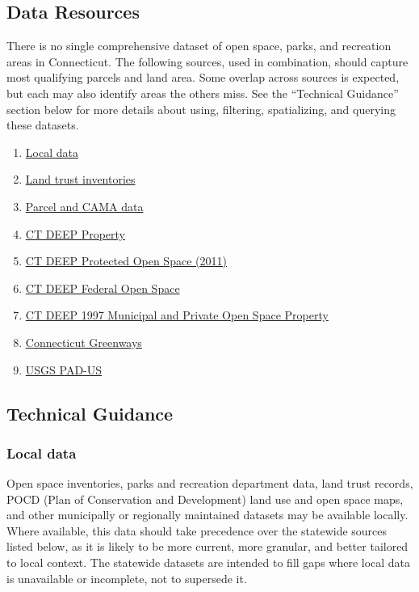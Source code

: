 \documentclass[
  letterpaper,
  DIV=11,
  numbers=noendperiod]{scrreprt}
\providecommand{\tightlist}{%
  \setlength{\itemsep}{0pt}\setlength{\parskip}{0pt}}
\begin{document}
\subsection{Data Resources}\label{data-resources-1}

There is no single comprehensive dataset of open space, parks, and
recreation areas in Connecticut. The following sources, used in
combination, should capture most qualifying parcels and land area. Some
overlap across sources is expected, but each may also identify areas the
others miss. See the ``Technical Guidance'' section below for more
details about using, filtering, spatializing, and querying these
datasets.

\begin{enumerate}
\def\labelenumi{\arabic{enumi}.}
\tightlist
\item
  \hyperref[sec-local-data2]{Local data}
\item
  \hyperref[sec-land-trust-inventories]{Land trust inventories}
\item
  \hyperref[sec-parcel-and-cama-data2]{Parcel and CAMA data}
\item
  \hyperref[sec-ct-deep-property]{CT DEEP Property}
\item
  \hyperref[sec-ct-deep-protected-open-space-2011]{CT DEEP Protected
  Open Space (2011)}
\item
  \hyperref[sec-ct-deep-federal-open-space]{CT DEEP Federal Open Space}
\item
  \hyperref[sec-ct-deep-1997-municipal-and-private-open-space-property]{CT
  DEEP 1997 Municipal and Private Open Space Property}
\item
  \hyperref[sec-greenways]{Connecticut Greenways}
\item
  \hyperref[sec-usgs-protected-areas-database-of-the-united-states]{USGS
  PAD-US}
\end{enumerate}

\subsection{Technical Guidance}\label{technical-guidance-1}

\subsubsection{Local data}\label{sec-local-data2}

Open space inventories, parks and recreation department data, land trust
records, POCD (Plan of Conservation and Development) land use and open
space maps, and other municipally or regionally maintained datasets may
be available locally. Where available, this data should take precedence
over the statewide sources listed below, as it is likely to be more
current, more granular, and better tailored to local context. The
statewide datasets are intended to fill gaps where local data is
unavailable or incomplete, not to supersede it.
\end{document}
